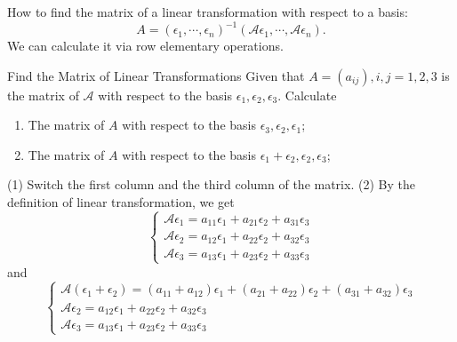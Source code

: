 \begin{note}
  How to find the matrix of a linear transformation with respect to a basis:
  \begin{equation}
    A = (\epsilon_1,\cdots,\epsilon_n)^{-1}(\mathcal{A}\epsilon_1,\cdots,\mathcal{A}\epsilon_n).
  \end{equation}
  We can calculate it via row elementary operations.
\end{note}

\begin{example}{Find the Matrix of Linear Transformations}{}
  Given that $A = (a_{ij}), i,j = 1,2,3$ is the matrix of $\mathcal{A}$
  with respect to the basis $\epsilon_1,\epsilon_2,\epsilon_3$. Calculate
  \begin{enumerate}
  \item The matrix of $A$ with respect to the basis $\epsilon_3, \epsilon_2, \epsilon_1$;
  \item The matrix of $A$ with respect to the basis $\epsilon_1 + \epsilon_2, \epsilon_2, \epsilon_3$;
  \end{enumerate}
\end{example}

\begin{solution}
  (1) Switch the first column and the third column of the matrix.
  (2) By the definition of linear transformation, we get
  \begin{equation}
    \begin{cases}
      \mathcal{A}\epsilon_1 = a_{11}\epsilon_1 + a_{21}\epsilon_2 + a_{31}\epsilon_3 \\
      \mathcal{A}\epsilon_2 = a_{12}\epsilon_1 + a_{22}\epsilon_2 + a_{32}\epsilon_3 \\
      \mathcal{A}\epsilon_3 = a_{13}\epsilon_1 + a_{23}\epsilon_2 + a_{33}\epsilon_3
    \end{cases}
  \end{equation}
  and
  \begin{equation}
    \begin{cases}
      \mathcal{A}(\epsilon_1 + \epsilon_2)= (a_{11} + a_{12})\epsilon_1 + (a_{21} + a_{22})\epsilon_2 + (a_{31} + a_{32})\epsilon_3 \\
      \mathcal{A}\epsilon_2 = a_{12}\epsilon_1 + a_{22}\epsilon_2 + a_{32}\epsilon_3 \\
      \mathcal{A}\epsilon_3 = a_{13}\epsilon_1 + a_{23}\epsilon_2 + a_{33}\epsilon_3
    \end{cases}
  \end{equation}
\end{solution}

